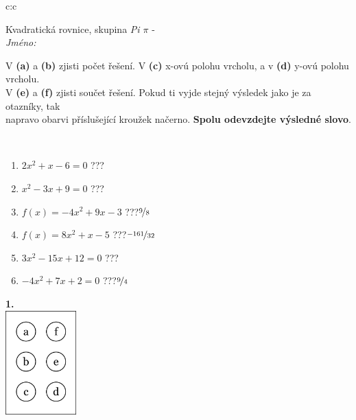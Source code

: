 \documentclass[10pt]{report}
\begin{document}
\begin{tabular}{c:c}
\begin{minipage}[c][104.5mm][t]{0.5\linewidth}
\begin{center}
\vspace{7mm}
{\huge Kvadratická rovnice, skupina \textit{Pi $\pi$} -}\\[5mm]
\textit{Jméno:}\phantom{xxxxxxxxxxxxxxxxxxxxxxxxxxxxxxxxxxxxxxxxxxxxxxxxxxxxxxxxxxxxxxxxx}\\[5mm]
\begin{minipage}{0.95\linewidth}
\begin{center}
V \textbf{(a)} a \textbf{(b)} zjisti počet řešení. V \textbf{(c)} x-ovú polohu vrcholu, a v \textbf{(d)} y-ovú polohu vrcholu.\\V \textbf{(e)} a \textbf{(f)} zjisti součet řešení. Pokud ti vyjde stejný výsledek jako je za otazníky, tak\\napravo obarvi příslušející kroužek načerno. \textbf{Spolu odevzdejte výsledné slovo}.
\end{center}
\end{minipage}
\\[1mm]
\begin{minipage}{0.79\linewidth}
\begin{center}
\begin{varwidth}{\linewidth}
\begin{enumerate}
\Large
\item $2x^2+x-6=0$\quad \dotfill\; ???\;\dotfill {}
\item $x^2-3x+9=0$\quad \dotfill\; ???\;\dotfill {}
\item $f(x)=-4x^2+9x-3$\quad \dotfill\; ???\;\dotfill \quad $\nicefrac{9}{8}$
\item $f(x)=8x^2+x-5$\quad \dotfill\; ???\;\dotfill \quad $\nicefrac{-161}{32}$
\item $3x^2-15x+12=0$\quad \dotfill\; ???\;\dotfill {}
\item $-4x^2+7x+2=0$\quad \dotfill\; ???\;\dotfill \quad $\nicefrac{9}{4}$
\end{enumerate}
\end{varwidth}
\end{center}
\end{minipage}
\begin{minipage}{0.20\linewidth}
\begin{center}
{\Huge\bfseries 1.} \\[2mm]
\includegraphics[height=40mm]{../images/braille.png}

\end{center}
\end{minipage}
\end{center}
\end{minipage}
\end{tabular}
\end{document}
